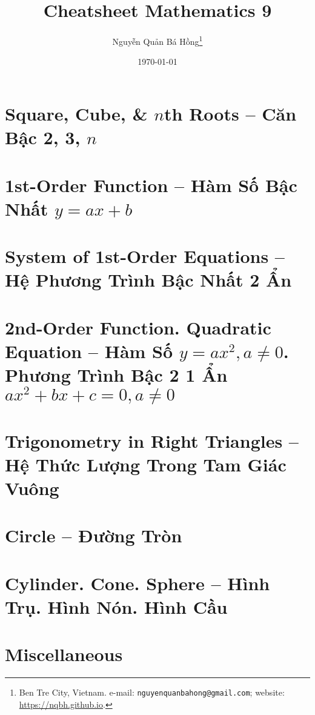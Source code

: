 \documentclass{article}
\title{Cheatsheet Mathematics 9}
\author{Nguyễn Quản Bá Hồng\footnote{Ben Tre City, Vietnam. e-mail: \texttt{nguyenquanbahong@gmail.com}; website: \url{https://nqbh.github.io}.}}
\date{\today}
\begin{document}
\maketitle
\tableofcontents


\section{Square, Cube, \& $n$th Roots -- Căn Bậc 2, 3, $n$}


\section{1st-Order Function -- Hàm Số Bậc Nhất $y = ax + b$}


\section{System of 1st-Order Equations -- Hệ Phương Trình Bậc Nhất 2 Ẩn}


\section{2nd-Order Function. Quadratic Equation -- Hàm Số $y = ax^2,a\ne0$. Phương Trình Bậc 2 1 Ẩn $ax^2 + bx + c = 0,a\ne0$}


\section{Trigonometry in Right Triangles -- Hệ Thức Lượng Trong Tam Giác Vuông}


\section{Circle -- Đường Tròn}


\section{Cylinder. Cone. Sphere -- Hình Trụ. Hình Nón. Hình Cầu}


\section{Miscellaneous}


\printbibliography[heading=bibintoc]
	
\end{document}
